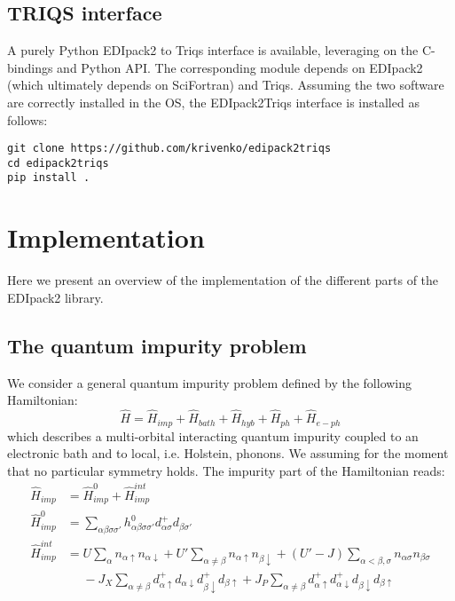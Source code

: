 \documentclass[preprint,3p,10pt]{elsarticle}
\def\a{\alpha}       \def\b{\beta}   \def\g{\gamma}   \def\d{\delta}
\def\NAME{{\rm EDIpack2 }}
\begin{document}
\subsection{TRIQS interface}
A purely Python \NAME to Triqs interface is available, leveraging on
the C-bindings and Python API. The corresponding module depends on
\NAME (which ultimately depends on SciFortran) and Triqs.
Assuming the two software are correctly installed in the OS, the
EDIpack2Triqs interface is installed as follows:

\begin{lstlisting}[style=mybash]
git clone https://github.com/krivenko/edipack2triqs
cd edipack2triqs
pip install .
\end{lstlisting}










\section{Implementation}\label{SecEDIpack}
Here we present an overview of the implementation of the
different parts of the \NAME library. 

\subsection{The quantum impurity problem}\label{sSecQIM}
We consider a general quantum impurity problem defined by the
following Hamiltonian:
$$
\hat{H} = \hat{H}_{imp} + \hat{H}_{bath} + \hat{H}_{hyb} + \hat{H}_{ph} + \hat{H}_{e-ph}
$$
which describes a  multi-orbital interacting quantum
impurity coupled to an electronic bath and to local, i.e. Holstein,
phonons. We assuming for the moment that no particular symmetry
holds. The impurity part of the Hamiltonian reads: 
\begin{equation}\label{Himp}
  \begin{split}
    \hat{H}_{imp} & = \hat{H}^0_{imp} + \hat{H}^{int}_{imp}\\
    \hat{H}^0_{imp} & =
    \sum_{\a\b\sigma\sigma'}h^{0}_{\a\b\sigma\sigma'}d^{+}_{\a\sigma}d_{\b\sigma'}\\
    \hat{H}^{int}_{imp} &=U\sum_{\a}n_{\a\uparrow}n_{\a\downarrow}+U'\sum_{\a\neq \b}n_{\a\uparrow}n_{\b\downarrow}+(U'-J)\sum_{\a<\b,\sigma}n_{\a\sigma}n_{\b\sigma}\\
    &{\phantom =}- J_X\sum_{\a\neq
      \b}d^{+}_{\a\uparrow}d_{\a\downarrow}d^{+}_{\b\downarrow}d_{\b\uparrow}+J_P\sum_{\a
      \neq
      \b}d^{+}_{\a\uparrow}d^{+}_{\a\downarrow}d_{\b\downarrow}d_{\b\uparrow}\\
\end{split}
\end{equation}
\end{document}
